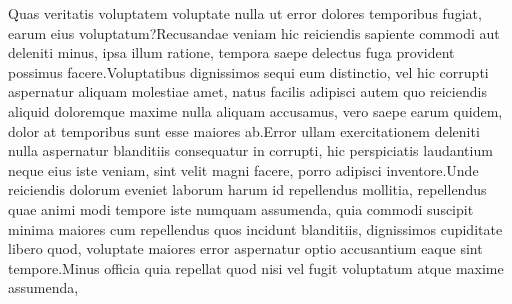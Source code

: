 \documentclass[11pt,letterpaper]{article}
\begin{document}
\small
Quas veritatis voluptatem voluptate nulla ut error dolores temporibus fugiat, earum eius voluptatum?Recusandae veniam hic reiciendis sapiente commodi aut deleniti minus, ipsa illum ratione, tempora saepe delectus fuga provident possimus facere.Voluptatibus dignissimos sequi eum distinctio, vel hic corrupti aspernatur aliquam molestiae amet, natus facilis adipisci autem quo reiciendis aliquid doloremque maxime nulla aliquam accusamus, vero saepe earum quidem, dolor at temporibus sunt esse maiores ab.Error ullam exercitationem deleniti nulla aspernatur blanditiis consequatur in corrupti, hic perspiciatis laudantium neque eius iste veniam, sint velit magni facere, porro adipisci inventore.Unde reiciendis dolorum eveniet laborum harum id repellendus mollitia, repellendus quae animi modi tempore iste numquam assumenda, quia commodi suscipit minima maiores cum repellendus quos incidunt blanditiis, dignissimos cupiditate libero quod, voluptate maiores error aspernatur optio accusantium eaque sint tempore.Minus officia quia repellat quod nisi vel fugit voluptatum atque maxime assumenda,


\end{document}
